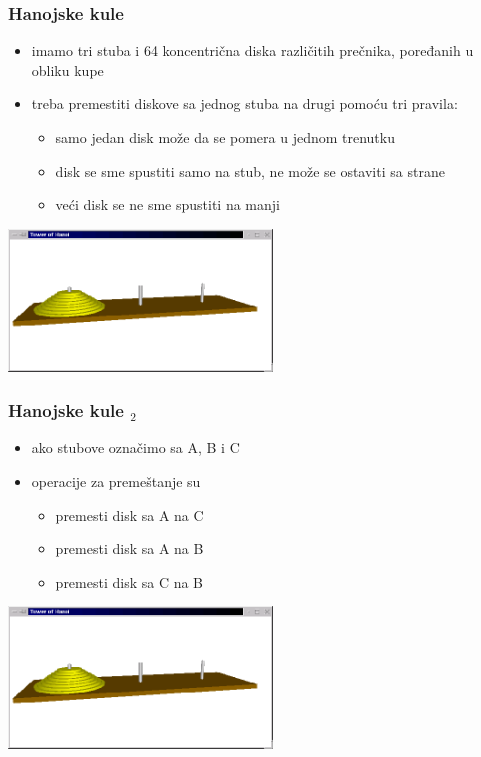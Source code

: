 \documentclass[utf8,compress,aspectratio=169]{beamer}
\begin{document}
\begin{frame}[fragile]
  \frametitle{Hanojske kule}
  \begin{itemize}
    \item imamo tri stuba i 64 koncentrična diska različitih prečnika, poređanih u obliku kupe
    \item treba premestiti diskove sa jednog stuba na drugi pomoću tri pravila:
  \begin{itemize}
    \item samo jedan disk može da se pomera u jednom trenutku
    \item disk se sme spustiti samo na stub, ne može se ostaviti sa strane
    \item veći disk se ne sme spustiti na manji
  \end{itemize}
  \end{itemize}
\begin{center}
  \includegraphics[width=7cm]{pic30}
\end{center}
\end{frame}

\begin{frame}[fragile]
  \frametitle{Hanojske kule $_2$}
  \begin{itemize}
    \item ako stubove označimo sa A, B i C
    \item operacije za premeštanje su
  \begin{itemize}
    \item premesti disk sa A na C
    \item premesti disk sa A na B
    \item premesti disk sa C na B
  \end{itemize}
  \end{itemize}
\begin{center}
  \includegraphics[width=7cm]{pic30}
\end{center}
\end{frame}
\end{document}
